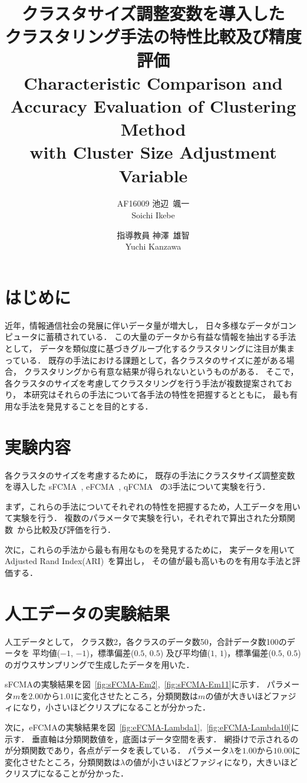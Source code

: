 \documentclass[twocolumn, a4paper]{icethesisabst}
\title{{\bf クラスタサイズ調整変数を導入した \\ クラスタリング手法の特性比較及び精度評価}
  {\normalsize \\ Characteristic Comparison and Accuracy Evaluation of Clustering Method \\ with Cluster Size Adjustment Variable}}
\author{
    AF16009 池辺~颯一 \\ Soichi Ikebe \and
    指導教員 神澤~雄智 \\ Yuchi Kanzawa
  }
\begin{document}
\maketitle


\section{はじめに}
近年，情報通信社会の発展に伴いデータ量が増大し，
日々多様なデータがコンピュータに蓄積されている．
この大量のデータから有益な情報を抽出する手法として，
データを類似度に基づきグループ化するクラスタリングに注目が集まっている．
既存の手法における課題として，各クラスタのサイズに差がある場合，
クラスタリングから有意な結果が得られないというものがある．
そこで，各クラスタのサイズを考慮してクラスタリングを行う手法が複数提案されており，
本研究はそれらの手法について各手法の特性を把握するとともに，
最も有用な手法を発見することを目的とする．


\section{実験内容}
各クラスタのサイズを考慮するために，
既存の手法にクラスタサイズ調整変数を導入した
sFCMA~\cite{sFCMA}, eFCMA~\cite{eFCMA}, qFCMA~\cite{qFCMA}
の3手法について実験を行う．

まず，これらの手法についてそれぞれの特性を把握するため，人工データを用いて実験を行う．
複数のパラメータで実験を行い，それぞれで算出された分類関数~\cite{cFunc}から比較及び評価を行う．

次に，これらの手法から最も有用なものを発見するために，
実データを用いてAdjusted Rand Index(ARI)~\cite{ARI}を算出し，
その値が最も高いものを有用な手法と評価する．


\section{人工データの実験結果}
人工データとして，
クラス数2，各クラスのデータ数50，合計データ数100のデータを
平均値($-1$, $-1$)，標準偏差($0.5$, $0.5$)
及び平均値($1$, $1$)，標準偏差($0.5$, $0.5$)
のガウスサンプリングで生成したデータを用いた．

sFCMAの実験結果を図~\ref{fig:sFCMA-Em2},~\ref{fig:sFCMA-Em11}に示す．
パラメータ$m$を$2.00$から$1.01$に変化させたところ，分類関数は$m$の値が大きいほどファジィになり，小さいほどクリスプになることが分かった．

次に，eFCMAの実験結果を図~\ref{fig:eFCMA-Lambda1},~\ref{fig:eFCMA-Lambda10}に示す．
垂直軸は分類関数値を，底面はデータ空間を表す．
網掛けで示されるのが分類関数であり，各点がデータを表している．
パラメータ$\lambda$を$1.00$から$10.00$に変化させたところ，分類関数は$\lambda$の値が小さいほどファジィになり，大きいほどクリスプになることが分かった．
\end{document}
